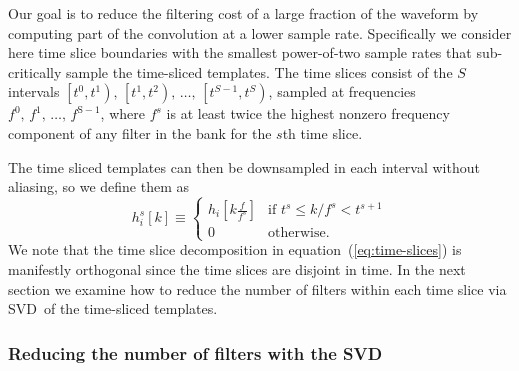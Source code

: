 \documentclass[preprint2]{aastex}
\newcommand{\SVD}{SVD}%
\begin{document}
Our goal is to reduce the filtering cost of a
large fraction of the waveform by computing part of the convolution at a lower
sample rate.  Specifically we consider here time slice boundaries with the
smallest power-of-two sample rates that sub-critically sample the time-sliced
templates.  The time slices consist of the $S$ intervals
$\left[t^0, t^1\right),\, \left[t^1, t^2\right),\, \dots,\, \left[t^{S-1}, t^S\right)$,
sampled at frequencies $f^0,\, f^1,\, \dots,\, f^\mathrm{S-1}$, where $f^s$ is at
least twice the highest nonzero frequency component of any filter in the bank for the
$s$th time slice.

The time sliced templates can then be downsampled in each interval without
aliasing, so we define them as
%
\begin{equation}
\label{eq:time-sliced-templates}
h_{i}^{s}[k] \equiv
	\begin{cases}
		h_{i}\!\left[k\frac{f}{f^s}\right] & \textrm{if } t^s \leqslant k/f^s < t^{s+1} \\
		0 & \textrm{otherwise.}
	\end{cases}
\end{equation}
%
We note that the time slice decomposition in equation~(\ref{eq:time-slices}) is
manifestly orthogonal since the time slices are disjoint in time.  In the next
section we examine how to reduce the number of filters within each time slice
via \SVD\ of the time-sliced templates.

\subsubsection{Reducing the number of filters with the \SVD}
\label{sec:svd}
\end{document}
